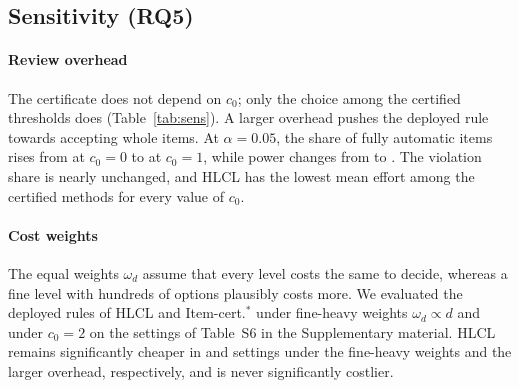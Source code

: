 \documentclass[preprint,12pt]{elsarticle}
\theoremstyle{definition}
\newcommand{\hlcl}{\textup{\textsc{HLCL}}}
\begin{document}
\subsection{Sensitivity (RQ5)}
\label{sec:res-sens}

\begin{table}[!tbp]
\centering
\footnotesize
\setlength{\tabcolsep}{3pt}
\caption{Sensitivity of \hlcl{} to the review overhead $c_0$, the calibration
size $n_{\mathrm{cal}}$ and the confidence level $\delta$ on the Blurb
collection with annotator A over 100 splits. ``Fully auto'' is the share of
items accepted at every level. The last three columns give the effort of the
certified baselines in the same setting. Here Item-cert.\ uses the automatic
test selection, not the per-setting best variant of Table~\ref{tab:main}.}
\label{tab:sens}

\end{table}

\paragraph{Review overhead}
The certificate does not depend on $c_0$; only the choice among the certified
thresholds does (Table~\ref{tab:sens}). A larger overhead pushes the deployed rule towards accepting
whole items. At $\alpha=0.05$, the share of fully automatic items rises from
 at $c_0=0$ to
 at $c_0=1$, while power changes from
 to . The
violation share is nearly unchanged, and \hlcl{} has the lowest mean effort among the
certified methods for every value of $c_0$.

\paragraph{Cost weights}
The equal weights $\omega_d$ assume that every level costs the same to decide,
whereas a fine level with hundreds of options plausibly costs more. We evaluated
the deployed rules of \hlcl{} and Item-cert.$^\ast$ under fine-heavy weights
$\omega_d\propto d$ and under $c_0=2$ on the  settings of
Table~S6 in the Supplementary material. \hlcl{} remains significantly cheaper in
 and  settings under the
fine-heavy weights and the larger overhead, respectively, and is never
significantly costlier.
\end{document}
